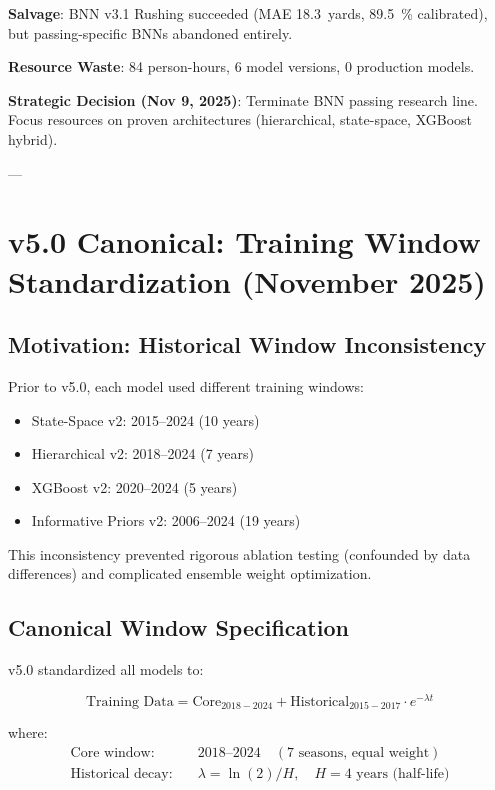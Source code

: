 \textbf{Salvage}: BNN v3.1 Rushing succeeded (MAE \SI{18.3}{yards}, \SI{89.5}{\percent} calibrated), but passing-specific BNNs abandoned entirely.

\textbf{Resource Waste}: 84 person-hours, 6 model versions, 0 production models.

\textbf{Strategic Decision (Nov 9, 2025)}: Terminate BNN passing research line. Focus resources on proven architectures (hierarchical, state-space, XGBoost hybrid).

---

\section{v5.0 Canonical: Training Window Standardization (November 2025)}

\subsection{Motivation: Historical Window Inconsistency}

Prior to v5.0, each model used different training windows:

\begin{itemize}
\item State-Space v2: 2015--2024 (10 years)
\item Hierarchical v2: 2018--2024 (7 years)
\item XGBoost v2: 2020--2024 (5 years)
\item Informative Priors v2: 2006--2024 (19 years)
\end{itemize}

This inconsistency prevented rigorous ablation testing (confounded by data differences) and complicated ensemble weight optimization.

\subsection{Canonical Window Specification}

v5.0 standardized all models to:

\begin{equation}
\text{Training Data} = \text{Core}_{2018-2024} + \text{Historical}_{2015-2017} \cdot e^{-\lambda t}
\end{equation}

where:
\begin{align}
\text{Core window:} & \quad 2018\text{--}2024 \quad (7 \text{ seasons, equal weight}) \\
\text{Historical decay:} & \quad \lambda = \ln(2) / H, \quad H = 4 \text{ years (half-life)}
\end{align}

